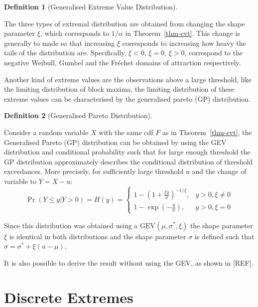 \documentclass[
  10pt,
  a4paper,
]{scrreprt}
\theoremstyle{definition}
\newtheorem{definition}{Definition}[section]
\theoremstyle{plain}
\theoremstyle{remark}
\begin{document}
{\begin{definition}[Generalised Extreme Value
Distribution]
\end{definition}

The three types of extremal distribution are obtained from changing the
shape parameter \(\xi\), which corresponds to \(1/\alpha\) in
Theorem~\ref{thm-evt}. This change is generally to made so that
increasing \(\xi\) corresponds to increasing how heavy the tails of the
distribution are. Specifically, \(\xi<0\), \(\xi=0\), \(\xi>0\),
correspond to the negative Weibull, Gumbel and the Fréchet domains of
attraction respectively.

Another kind of extreme values are the observations above a large
threshold, like the limiting distribution of block maxima, the limiting
distribution of these extreme values can be characterised by the
generalised pareto (GP) distribution.

\begin{definition}[Generalised Pareto
Distribution]\protect\hypertarget{def-gp}{}\label{def-gp}

Consider a random variable \(X\) with the same cdf \(F\) as in
Theorem~\ref{thm-evt}, the Generalised Pareto (GP) distribution can be
obtained by using the GEV distribution and conditional probability such
that for large enough threshold the GP distribution approximately
describes the conditional distribution of threshold exceedances. More
precisely, for sufficiently large threshold \(u\) and the change of
variable to \(Y=X-u\): \[
\Pr(Y\le y | Y>0) = H(y) = \begin{cases}
1-\left(1+\displaystyle\frac{\xi y}{\sigma}\right)^{-1/\xi},&y>0,\xi\ne 0 \\
1-\exp\left(-\displaystyle\frac{y}{\sigma}\right),&y>0,\xi = 0
\end{cases}
\]

\end{definition}

Since this distribution was obtained using a
\(\text{GEV}(\mu,\sigma^*,\xi)\) the shape parameter \(\xi\) is
identical in both distributions and the shape parameter \(\sigma\) is
defined such that \(\sigma = \sigma^* + \xi(u-\mu)\).

It is also possible to derive the result without using the GEV, as shown
in {[}REF{]}.

\hypertarget{discrete-extremes}{%
\section{Discrete Extremes}\label{discrete-extremes}}

}
\end{document}
